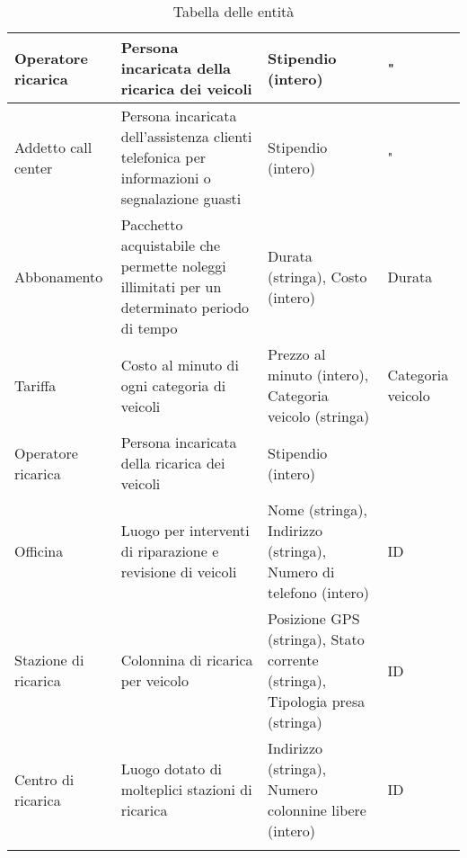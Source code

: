 \documentclass{article}
\begin{document}
\begin{longtable}[H]{|p{2.5cm}|p{4.8cm}|p{4.8cm}|p{2.3cm}|}
Operatore ricarica & Persona incaricata della ricarica dei veicoli & Stipendio (intero) & " \\ \hline
Addetto call center & Persona incaricata dell'assistenza clienti telefonica per informazioni o segnalazione guasti & Stipendio (intero) & " \\ \hline
Abbonamento & Pacchetto acquistabile che permette noleggi illimitati per un determinato periodo di tempo & Durata (stringa), Costo (intero) & Durata \\ \hline
Tariffa & Costo al minuto di ogni categoria di veicoli & Prezzo al minuto (intero), Categoria veicolo (stringa) & Categoria veicolo \\ \hline
Operatore ricarica & Persona incaricata della ricarica dei veicoli & Stipendio (intero) &  \\ \hline
Officina & Luogo per interventi di riparazione e revisione di veicoli & Nome (stringa), Indirizzo (stringa), Numero di telefono (intero) & ID \\ \hline
Stazione di ricarica & Colonnina di ricarica per veicolo & Posizione GPS (stringa), Stato corrente (stringa), Tipologia presa (stringa) & ID \\ \hline
Centro di ricarica & Luogo dotato di molteplici stazioni di ricarica & Indirizzo (stringa), Numero colonnine libere (intero) & ID \\ \hline
\caption{Tabella delle entità}
\label{table_glossario_termini}
\end{longtable}
\end{document}

